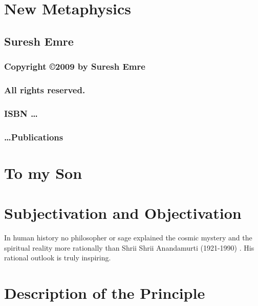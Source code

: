 \documentclass[12pt]{book}
\begin{document}
 
\frontmatter
 
\chapter*{\Huge \center New Metaphysics }
\thispagestyle{empty}
\section*{\huge \center Suresh Emre}
\newpage
\subsection*{\center \normalsize Copyright \copyright 2009 by Suresh Emre}
\subsection*{\center \normalsize All rights reserved.}
\subsection*{\center \normalsize ISBN \dots}
\subsection*{\center \normalsize \dots Publications}
\chapter*{\center \normalsize To my Son}
 
\tableofcontents
 
\mainmatter
\chapter{Subjectivation and Objectivation}
 
In human history no philosopher or sage explained the cosmic mystery and the spiritual reality more rationally than Shrii Shrii Anandamurti (1921-1990) \cite{baba_books} \cite{anandamitra}. His rational outlook is truly inspiring.
 
\chapter{Description of the Principle} 
 
 
 
 
\end{document}
